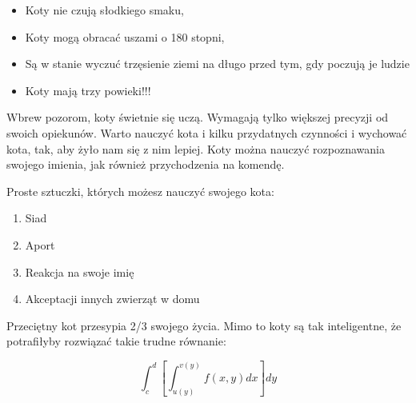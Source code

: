 \begin{flushleft}
\newpage
\vspace {0.80cm}




\begin{itemize}
  \item Koty nie czują słodkiego smaku,
  \item Koty mogą obracać uszami o 180 stopni,
  \item Są w stanie wyczuć trzęsienie ziemi na długo przed tym, gdy poczują je ludzie
  \item Koty mają trzy powieki!!!
\end{itemize}

\maketitle 
    Wbrew pozorom, koty świetnie się uczą. Wymagają tylko większej precyzji od swoich opiekunów. Warto nauczyć kota i kilku przydatnych czynności i wychować kota, tak, aby żyło nam się z nim lepiej. Koty można nauczyć rozpoznawania swojego imienia, jak również przychodzenia na komendę.

\noindent Proste sztuczki, których możesz nauczyć swojego kota:

\begin{enumerate}
  \item Siad
  \item Aport
   \item Reakcja na swoje imię
    \item Akceptacji innych zwierząt w domu
\end{enumerate}


Przeciętny kot przesypia 2/3 swojego życia. Mimo to koty są tak inteligentne, że potrafiłyby rozwiązać takie trudne równanie:  


$$\int_{c}^{d} \left[ \int_{u(y)}^{v(y)} f(x,y)dx \right] dy$$


\end{flushleft}